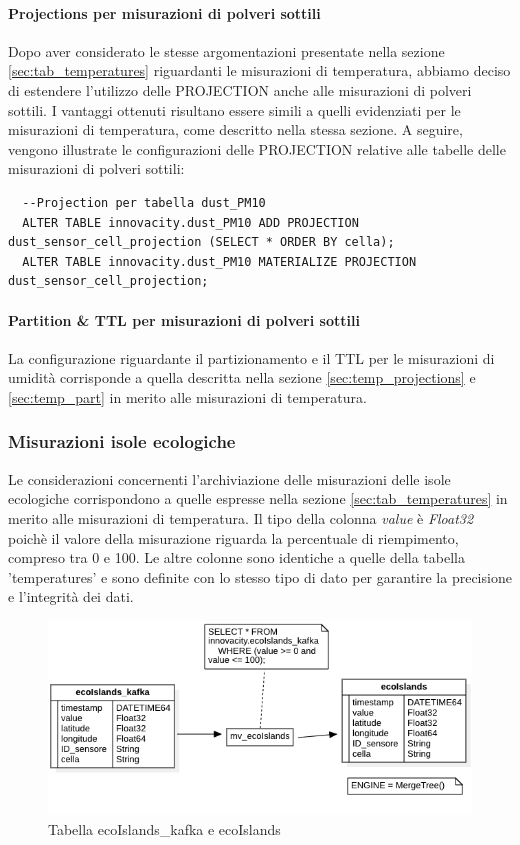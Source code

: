 \paragraph{Projections per misurazioni di polveri sottili} 
Dopo aver considerato le stesse argomentazioni presentate nella sezione \ref{sec:tab_temperatures} riguardanti le misurazioni di temperatura, abbiamo deciso di estendere l'utilizzo delle PROJECTION anche alle misurazioni di polveri sottili. I vantaggi ottenuti risultano essere simili a quelli evidenziati per le misurazioni di temperatura, come descritto nella stessa sezione. A seguire, vengono illustrate le configurazioni delle PROJECTION relative alle tabelle delle misurazioni di polveri sottili:

\begin{lstlisting}
  --Projection per tabella dust_PM10
  ALTER TABLE innovacity.dust_PM10 ADD PROJECTION dust_sensor_cell_projection (SELECT * ORDER BY cella);
  ALTER TABLE innovacity.dust_PM10 MATERIALIZE PROJECTION dust_sensor_cell_projection;
\end{lstlisting}

\paragraph{Partition \& TTL per misurazioni di polveri sottili}
La configurazione riguardante il partizionamento e il TTL per le misurazioni di umidità corrisponde a quella descritta nella sezione \ref{sec:temp_projections} e \ref{sec:temp_part} in merito alle misurazioni di temperatura.
\subsubsection{Misurazioni isole ecologiche}
Le considerazioni concernenti l'archiviazione delle misurazioni delle isole ecologiche corrispondono a quelle espresse nella sezione \ref{sec:tab_temperatures} in merito alle misurazioni di temperatura. Il tipo della colonna \textit{value} è \textit{Float32} poichè il valore della misurazione riguarda la percentuale di riempimento, compreso tra 0 e 100. Le altre colonne sono identiche a quelle della tabella 'temperatures' e sono definite con lo stesso tipo di dato per garantire la precisione e l'integrità dei dati.

\begin{figure}[H]
  \centering
  \includegraphics[width=1\textwidth]{../Images/SpecificaTecnica/ecoIslands.png}
  \caption{Tabella ecoIslands\_kafka e ecoIslands}
  \label{fig:ecoIslands_tables}
\end{figure}

